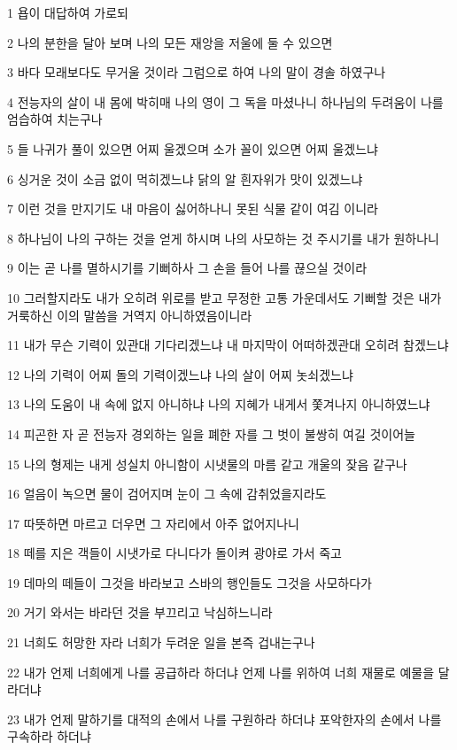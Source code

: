 \par 1 욥이 대답하여 가로되
\par 2 나의 분한을 달아 보며 나의 모든 재앙을 저울에 둘 수 있으면
\par 3 바다 모래보다도 무거울 것이라 그럼으로 하여 나의 말이 경솔 하였구나
\par 4 전능자의 살이 내 몸에 박히매 나의 영이 그 독을 마셨나니 하나님의 두려움이 나를 엄습하여 치는구나
\par 5 들 나귀가 풀이 있으면 어찌 울겠으며 소가 꼴이 있으면 어찌 울겠느냐
\par 6 싱거운 것이 소금 없이 먹히겠느냐 닭의 알 흰자위가 맛이 있겠느냐
\par 7 이런 것을 만지기도 내 마음이 싫어하나니 못된 식물 같이 여김 이니라
\par 8 하나님이 나의 구하는 것을 얻게 하시며 나의 사모하는 것 주시기를 내가 원하나니
\par 9 이는 곧 나를 멸하시기를 기뻐하사 그 손을 들어 나를 끊으실 것이라
\par 10 그러할지라도 내가 오히려 위로를 받고 무정한 고통 가운데서도 기뻐할 것은 내가 거룩하신 이의 말씀을 거역지 아니하였음이니라
\par 11 내가 무슨 기력이 있관대 기다리겠느냐 내 마지막이 어떠하겠관대 오히려 참겠느냐
\par 12 나의 기력이 어찌 돌의 기력이겠느냐 나의 살이 어찌 놋쇠겠느냐
\par 13 나의 도움이 내 속에 없지 아니하냐 나의 지혜가 내게서 쫓겨나지 아니하였느냐
\par 14 피곤한 자 곧 전능자 경외하는 일을 폐한 자를 그 벗이 불쌍히 여길 것이어늘
\par 15 나의 형제는 내게 성실치 아니함이 시냇물의 마름 같고 개울의 잦음 같구나
\par 16 얼음이 녹으면 물이 검어지며 눈이 그 속에 감취었을지라도
\par 17 따뜻하면 마르고 더우면 그 자리에서 아주 없어지나니
\par 18 떼를 지은 객들이 시냇가로 다니다가 돌이켜 광야로 가서 죽고
\par 19 데마의 떼들이 그것을 바라보고 스바의 행인들도 그것을 사모하다가
\par 20 거기 와서는 바라던 것을 부끄리고 낙심하느니라
\par 21 너희도 허망한 자라 너희가 두려운 일을 본즉 겁내는구나
\par 22 내가 언제 너희에게 나를 공급하라 하더냐 언제 나를 위하여 너희 재물로 예물을 달라더냐
\par 23 내가 언제 말하기를 대적의 손에서 나를 구원하라 하더냐 포악한자의 손에서 나를 구속하라 하더냐
